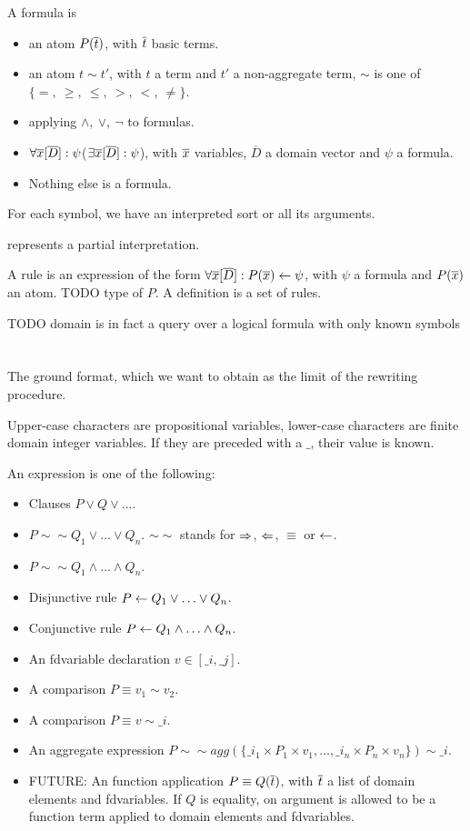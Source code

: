 \documentclass{article}
\newcommand{\DDD}{\ensuremath{\overline{D}}}
\begin{document}
A formula is 
\begin{itemize}
  \item an atom $P(\overline{t})$, with $\overline{t}$ basic terms.
  \item an atom $t \sim t'$, with $t$ a term and $t'$ a non-aggregate term, $\sim$ is one of $\{=,~\geq,~\leq,~>,~<,~\neq\}$.
  \item applying $\land,~\lor,~\lnot$ to formulas.
  \item $\forall \xxx[\DDD]: \psi$($\exists \xxx[\DDD]: \psi$), with $\overline{x}$ variables, $\DDD$ a domain vector and $\psi$ a formula.
  \item Nothing else is a formula. 
\end{itemize}

For each symbol, we have an interpreted sort or all its arguments.

\inter represents a partial interpretation.

A rule is an expression of the form $\forall \xxx[\DDD]: P(\xxx) \lrule \psi$, with $\psi$ a formula and $P(\overline{x})$ an atom. 
TODO type of $P$.
A definition is a set of rules.

TODO domain is in fact a query over a logical formula with only known symbols


\section{\pcdot}
The ground format, which we want to obtain as the limit of the rewriting procedure.

Upper-case characters are propositional variables, lower-case characters are finite domain integer variables.
If they are preceded with a $\_$, their value is known.

An expression is one of the following:
\begin{itemize}
  \item Clauses $P \lor Q \lor \ldots$.
  \item $P \sim\sim Q_1 \lor \ldots \lor Q_n$. $\sim\sim$ stands for $\Rightarrow$, $\Leftarrow$, $\equiv$ or $\leftarrow$.
  \item $P \sim\sim Q_1 \land \ldots \land Q_n$.
  \item Disjunctive rule $P \leftarrow Q_1 \lor \ldots \lor Q_n$.
  \item Conjunctive rule $P \leftarrow Q_1 \land \ldots \land Q_n$.
  \item An fdvariable declaration $v \in [\_i, \_j]$.
  \item A comparison $P \equiv v_1 \sim v_2$.
  \item A comparison $P \equiv v \sim \_i$.
  \item An aggregate expression $P \sim\sim agg(\{\_i_1 \times P_1 \times v_1,\ldots,\_i_n \times P_n \times v_n\}) \sim \_i$. 
  \item FUTURE: An function application $P \equiv Q(\overline{t})$, with $\overline{t}$ a list of domain elements and fdvariables. If $Q$ is equality, on argument is allowed to be a function term applied to domain elements and fdvariables.
\end{itemize}
\end{document}
